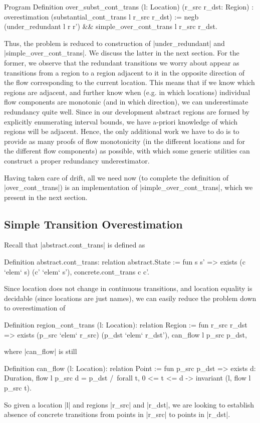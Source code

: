 \documentclass[runningheads]{llncs}
\begin{document}
\begin{code}
  Program Definition over_subst_cont_trans (l: Location) (r_src r_dst: Region)
    : overestimation (substantial_cont_trans l r_src r_dst)
    := negb (under_redundant l r r') && simple_over_cont_trans l r_src r_dst.
\end{code}

Thus, the problem is reduced to construction of |under_redundant| and |simple_over_cont_trans|. We discuss the latter in the next section. For the former, we observe that the redundant transitions we worry about appear as transitions from a region to a region adjacent to it in the opposite direction of the flow corresponding to the current location. This means that if we know which regions are adjacent, and further know when (e.g. in which locations) individual flow components are monotonic (and in which direction), we can underestimate redundancy quite well. Since in our development abstract regions are formed by explicitly enumerating interval bounds, we have a-priori knowledge of which regions will be adjacent. Hence, the only additional work we have to do is to provide as many proofs of flow monotonicity (in the different locations and for the different flow components) as possible, with which some generic utilities can construct a proper redundancy underestimator.

Having taken care of drift, all we need now (to complete the definition of |over_cont_trans|) is an implementation of |simple_over_cont_trans|, which we present in the next section.

\subsection{Simple Transition Overestimation}

Recall that |abstract.cont_trans| is defined as
\begin{code}
Definition abstract.cont_trans: relation abstract.State
  := fun s s' => exists (c `elem` s) (c' `elem` s'), concrete.cont_trans c c'.
\end{code}
Since location does not change in continuous transitions, and location equality is decidable (since locations are just names), we can easily reduce the problem down to overestimation of
\begin{code}
Definition region_cont_trans (l: Location): relation Region
  := fun r_src r_dst => exists (p_src `elem` r_src) (p_dst `elem` r_dst'), can_flow l p_src p_dst,
\end{code}
where |can_flow| is still
\begin{code}
Definition can_flow (l: Location): relation Point
  := fun p_src p_dst => exists d: Duration, flow l p_src d = p_dst /\
    forall t, 0 <= t <= d -> invariant (l, flow l p_src t).
\end{code}
So given a location |l| and regions |r_src| and |r_dst|, we are looking to establish absence of concrete transitions from points in |r_src| to points in |r_dst|.
\end{document}
